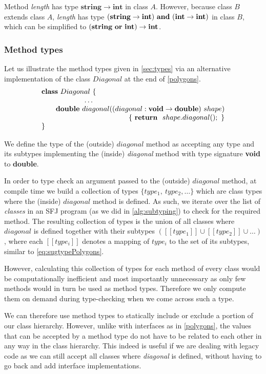 \documentclass[runningheads]{llncs}
\begin{document}
Method {\it length} has type $\mathbf{string} \rightarrow \mathbf{int}$ in class $A$.
However, because class $B$ extends class $A$,  {\it length} has type $(\mathbf{string} \rightarrow \mathbf{int})\ \synwedge\ (\mathbf{int} \rightarrow \mathbf{int})$ in class $B$,
which can be simplified to $(\mathbf{string}\ \synvee\ \mathbf{int}) \rightarrow \mathbf{int}$.

\subsubsection{Method types}
Let us illustrate the method types given in \autoref{sec:types} via an alternative implementation of the class $Diagonal$ at the end of \autoref{polygons}.
$$
\begin{array}{l}
    \synclass Diagonal \ \{
    \\
    \qquad\qquad\qquad \ldots \\
    \qquad \textbf{double}\ diagonal((diagonal: \textbf{void} \rightarrow \textbf{double})\ shape)\\
    \hfill
    \{\ \synret\ shape.diagonal();\ \}
    \\
    \}
\end{array}
$$

We define the type of the (outside) $diagonal$ method as accepting any type and its subtypes implementing the (inside) \emph{diagonal} method with type signature \textbf{void} to \textbf{double}.

In order to type check an argument passed to the (outside) $diagonal$ method, at compile time we build a collection of types $\{type_{1},\ type_{2},\ldots\}$ which are class types where the (inside) $diagonal$ method is defined.
As such, we iterate over the list of \emph{classes} in an SFJ program (as we did in \autoref{alg:subtyping}) to check for the required method.
The resulting collection of types is the union of all classes where $diagonal$ is defined together with their subtypes $([\![type_{1}]\!] \cup [\![type_{2}]\!] \cup \ldots)$, where each $[\![type_{i}]\!]$ denotes a mapping of $type_i$ to the set of its subtypes, similar to \autoref{eq:sugtypePolygons}.

However, calculating this collection of types for each method of every class would be computationally inefficient and most importantly unnecessary as only few methods would in turn be used as method types.
Therefore we only compute them on demand during type-checking when we come across such a type.

We can therefore use method types to statically include or exclude a portion of our class hierarchy.
However, unlike with interfaces as in \autoref{polygons}, the values that can be accepted by a method type do not have to be related to each other in any way in the class hierarchy.
This indeed is useful if we are dealing with legacy code as we can still accept all classes where \emph{diagonal} is defined, without having to go back and add interface implementations.
\end{document}
